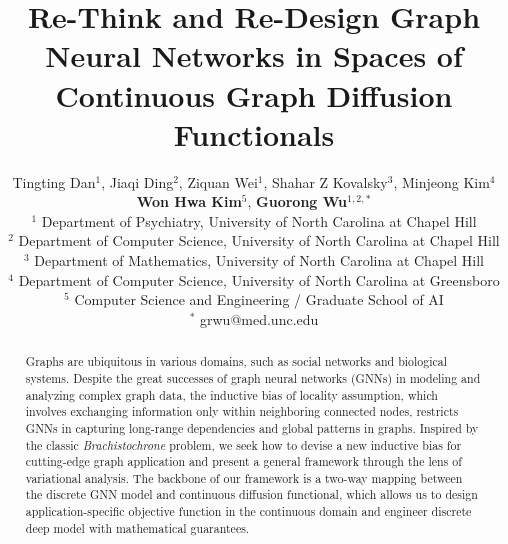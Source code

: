 \documentclass{article}
\title{Re-Think and Re-Design Graph Neural Networks in Spaces of Continuous Graph Diffusion Functionals}
\author{%
   Tingting Dan${^1}$, Jiaqi Ding${^2}$, Ziquan Wei${^1}$, Shahar Z Kovalsky${^3}$, Minjeong Kim${^4}$\\
    \textbf{Won Hwa Kim}${^5}$, \textbf{Guorong Wu}${^{1,2,*}}$\\
${^1}$ Department of Psychiatry, University of North Carolina at Chapel Hill\\
${^2}$ Department of Computer Science, University of North Carolina at Chapel Hill\\
${^3}$ Department of Mathematics, University of North Carolina at Chapel Hill\\
${^4}$ Department of Computer Science, University of North Carolina at Greensboro\\
${^5}$ Computer Science and Engineering / Graduate School of AI\\
${^*}$ grwu@med.unc.edu\\
}
\begin{document}
\maketitle


\begin{abstract}

Graphs are ubiquitous in various domains, such as social networks and biological systems. Despite the great successes of graph neural networks (GNNs) in modeling and analyzing complex graph data, the inductive bias of locality assumption, which involves exchanging information only within neighboring connected nodes, restricts GNNs in capturing long-range dependencies and global patterns in graphs. Inspired by the classic \textit{Brachistochrone} problem, we seek how to devise a new inductive bias for cutting-edge graph application and present a general framework through the lens of variational analysis. The backbone of our framework is a two-way mapping between the discrete GNN model and continuous diffusion functional, which allows us to design application-specific objective function in the continuous domain and engineer discrete deep model with mathematical guarantees.

\end{abstract}
\end{document}
